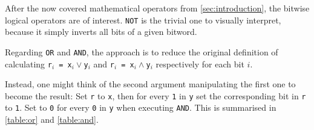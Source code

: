 After the now covered mathematical operators from
\autoref{sec:introduction},
the bitwise logical operators are of interest.
\lstinline$NOT$ is the trivial one to visually interpret,
because it simply inverts all bits of a given bitword.

Regarding \lstinline$OR$ and \lstinline$AND$,
the approach is to reduce the original definition of calculating
\lstinline$r$$_i$\lstinline$ = x$$_i \lor$\lstinline$y$$_i$ and
\lstinline$r$$_i$\lstinline$ = x$$_i \land$\lstinline$y$$_i$ respectively
for each bit $i$.

Instead, one might think of the second argument
manipulating the first one to become the result:
Set \lstinline$r$ to \lstinline$x$, then
for every \lstinline$1$ in \lstinline$y$
set the corresponding bit in \lstinline$r$ to \lstinline$1$.
Set to \lstinline$0$ for every \lstinline$0$ in \lstinline$y$
when executing \lstinline$AND$.
This is summarised in \autoref{table:or} and \autoref{table:and}.
